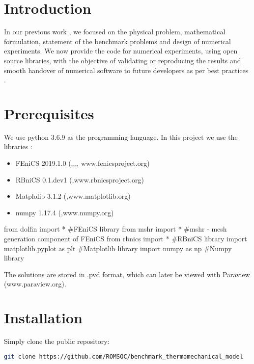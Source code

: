 \section{Introduction}

In our previous work \cite{benchmark_chapter}, we focused on the physical problem, mathematical formulation, statement of the benchmark problems and design of numerical experiments. We now provide the code for numerical experiments, using open source libraries, with the objective of validating or reproducing the results and smooth handover of numerical software to future developers as per best practices \cite{software_handover_paper}.

\section{Prerequisites}

We use python 3.6.9 as the programming language. In this project we use the libraries :
\begin{itemize}
\item FEniCS 2019.1.0 (\cite{fenics1},\cite{fenics2},\cite{dolfin1},\cite{dolfin2}, www.fenicsproject.org)
\item RBniCS 0.1.dev1 (\cite{crbm},www.rbnicsproject.org)
\item Matplolib 3.1.2 (\cite{matplotlib},www.matplotlib.org)
\item numpy 1.17.4 (\cite{numpy},www.numpy.org)
\end{itemize}

\begin{python}
from dolfin import * #FEniCS library
from mshr import * #mshr - mesh generation component of FEniCS
from rbnics import * #RBniCS library
import matplotlib.pyplot as plt #Matplotlib library
import numpy as np #Numpy library
\end{python}

The solutions are stored in .pvd format, which can later be viewed with Paraview (www.paraview.org).

\section{Installation}

Simply clone the public repository:

\begin{lstlisting}[language=bash]
git clone https://github.com/ROMSOC/benchmark_thermomechanical_model
\end{lstlisting}


